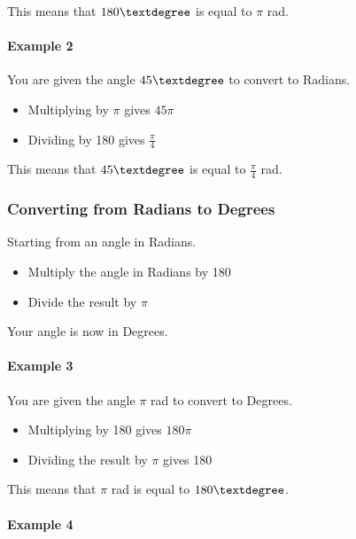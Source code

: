 \documentclass[
  12pt,
  a4paper, oneside]{starmastarticle}
\let\oldparagraph\paragraph
\renewcommand{\paragraph}[1]{\oldparagraph{#1}\mbox{}}
\providecommand{\tightlist}{%
  \setlength{\itemsep}{0pt}\setlength{\parskip}{0pt}}\usepackage{longtable,booktabs,array}
\begin{document}
This means that \(180\textdegree\) is equal to \(\pi\) rad.

\hypertarget{example-2}{%
\paragraph{Example 2}\label{example-2}}

You are given the angle \(45\textdegree\) to convert to Radians.

\begin{itemize}
\tightlist
\item
  Multiplying by \(\pi\) gives \(45\pi\)
\item
  Dividing by 180 gives \(\frac{\pi}{4}\)
\end{itemize}

This means that \(45\textdegree\) is equal to \(\frac{\pi}{4}\) rad.

\hypertarget{converting-from-radians-to-degrees}{%
\subsubsection{Converting from Radians to
Degrees}\label{converting-from-radians-to-degrees}}

Starting from an angle in Radians.

\begin{itemize}
\tightlist
\item
  Multiply the angle in Radians by 180
\item
  Divide the result by \(\pi\)
\end{itemize}

Your angle is now in Degrees.

\hypertarget{example-3}{%
\paragraph{Example 3}\label{example-3}}

You are given the angle \(\pi\) rad to convert to Degrees.

\begin{itemize}
\tightlist
\item
  Multiplying by 180 gives \(180\pi\)
\item
  Dividing the result by \(\pi\) gives 180
\end{itemize}

This means that \(\pi\) rad is equal to \(180\textdegree\).

\hypertarget{example-4}{%
\paragraph{Example 4}\label{example-4}}
\end{document}
